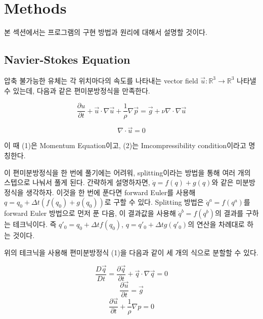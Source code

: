 \documentclass[12pt, A4]{article}
\begin{document}
\section{Methods}

본 섹션에서는 프로그램의 구현 방법과 원리에 대해서 설명할 것이다.

\subsection{Navier-Stokes Equation}

압축 불가능한 유체는 각 위치마다의 속도를 나타내는 vector field $\vec{u} : \mathbb{R}
^3 \rightarrow \mathbb{R}^3$ 나타낼 수 있는데, 다음과 같은 편미분방정식을 만족한다.

\begin{equation}
  \frac{\partial u}{\partial t} + \vec{u} \cdot \nabla{\vec{u}} + \frac{1}{\rho} \nabla{\vec{p}} = \vec{g} + \nu \nabla \cdot \nabla \vec{u}
\end{equation}

\begin{equation}
  \nabla \cdot \vec{u} = 0
\end{equation}

이 때 (1)은 Momentum Equation이고, (2)는 Imcompressibility condition이라고 명칭한다. 

이 편미분방정식을 한 번에 풀기에는 어려워, splitting이라는 방법을 통해 여러 개의 스텝으로 나눠서 풀게 된다.
간략하게 설명하자면, $\dot q = f(q) + g(q)$와 같은 미분방정식을 생각하자.
이것을 한 번에 푼다면 forward Euler를 사용해 $q = q_0 + \Delta t (f(q_0) + g(q_0))$로 구할 수 있다.
Splitting 방법은 $\dot q^a = f(q^a)$를 forward Euler 방법으로 먼저 푼 다음, 이 결과값을 사용해 $\dot q^b = f(q^b)$의 결과를 구하는 테크닉이다. 즉 $q'_0 = q_0 + \Delta t f(q_0)$, $q = q'_0 + \Delta t g(q'_0)$의 연산을 차례대로 하는 것이다. \cite[p.17-19]{fluid-sim-cg}

위의 테크닉을 사용해 편미분방정식 (1)을 다음과 같이 세 개의 식으로 분할할 수 있다.

\begin{equation}
  \frac{D\vec{q}}{Dt} = \frac{\partial \vec{q}}{\partial t} + \vec{q} \cdot \nabla \vec{q} = 0
\end{equation}
\begin{equation}
  \frac{\partial \vec{u}}{\partial t} = \vec{g}
\end{equation}
\begin{equation}
  \frac{\partial \vec{u}}{\partial t} + \frac{1}{\rho} \nabla p = 0
\end{equation}
\end{document}
